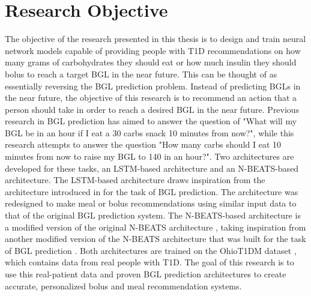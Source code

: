 \section{Research Objective}
\label{section:objective}
The objective of the research presented in this thesis is to design and train neural network models capable of providing people with \ac{T1D} recommendations on how many grams of carbohydrates they should eat or how much insulin they should bolus to reach a target \ac{BGL} in the near future. This can be thought of as essentially reversing the \ac{BGL} prediction problem. Instead of predicting \ac{BGLs} in the near future, the objective of this research is to recommend an action that a person should take in order to reach a desired \ac{BGL} in the near future. Previous research in \ac{BGL} prediction \cite{mirshekarian:bgl_pred} has aimed to answer the question of "What will my \ac{BGL} be in an hour if I eat a 30 carbs snack 10 minutes from now?", while this research attempts to answer the question "How many carbs should I eat 10 minutes from now to raise my \ac{BGL} to 140 in an hour?". Two architectures are developed for these tasks, an LSTM-based architecture and an N-BEATS-based architecture. The LSTM-based architecture draws inspiration from the architecture introduced in \cite{mirshekarian:bgl_pred} for the task of \ac{BGL} prediction. The architecture was redesigned to make meal or bolus recommendations using similar input data to that of the original \ac{BGL} prediction system. The N-BEATS-based architecture is a modified version of the original N-BEATS architecture \cite{oreshkin:nbeats}, taking inspiration from another modified version of the N-BEATS architecture that was built for the task of \ac{BGL} prediction \cite{rubin_falcone:nbeats_bgl}. Both architectures are trained on the OhioT1DM dataset \cite{ohiot1dm:marling:kdh18}, which contains data from real people with \ac{T1D}. The goal of this research is to use this real-patient data and proven \ac{BGL} prediction architectures to create accurate, personalized bolus and meal recommendation systems.

